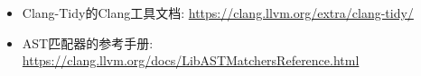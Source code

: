 
\begin{itemize}
\item
Clang-Tidy的Clang工具文档: \url{https://clang.llvm.org/extra/clang-tidy/}

\item
AST匹配器的参考手册: \url{https://clang.llvm.org/docs/LibASTMatchersReference.html}
\end{itemize}
